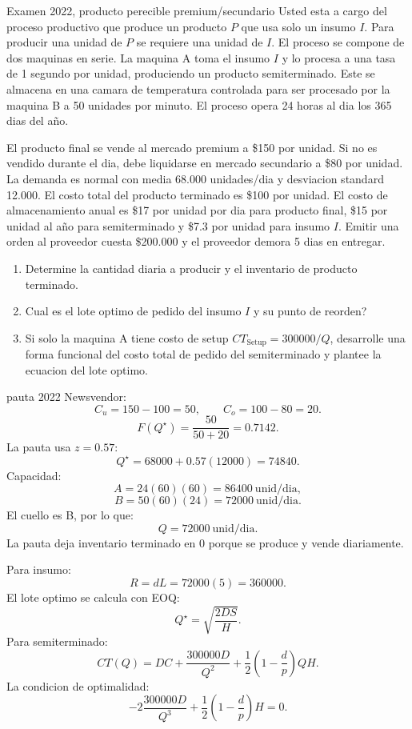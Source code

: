 \begin{enunciado}{Examen 2022, producto perecible premium/secundario}
Usted esta a cargo del proceso productivo que produce un producto $P$ que usa solo un insumo $I$. Para producir una unidad de $P$ se requiere una unidad de $I$. El proceso se compone de dos maquinas en serie. La maquina A toma el insumo $I$ y lo procesa a una tasa de 1 segundo por unidad, produciendo un producto semiterminado. Este se almacena en una camara de temperatura controlada para ser procesado por la maquina B a 50 unidades por minuto. El proceso opera 24 horas al dia los 365 dias del año.

El producto final se vende al mercado premium a \$150 por unidad. Si no es vendido durante el dia, debe liquidarse en mercado secundario a \$80 por unidad. La demanda es normal con media 68.000 unidades/dia y desviacion standard 12.000. El costo total del producto terminado es \$100 por unidad. El costo de almacenamiento anual es \$17 por unidad por dia para producto final, \$15 por unidad al año para semiterminado y \$7.3 por unidad para insumo $I$. Emitir una orden al proveedor cuesta \$200.000 y el proveedor demora 5 dias en entregar.

\begin{enumerate}[label=\roman*.]
  \item Determine la cantidad diaria a producir y el inventario de producto terminado.
  \item Cual es el lote optimo de pedido del insumo $I$ y su punto de reorden?
  \item Si solo la maquina A tiene costo de setup $CT_{\text{Setup}}=300000/Q$, desarrolle una forma funcional del costo total de pedido del semiterminado y plantee la ecuacion del lote optimo.
\end{enumerate}
\end{enunciado}

\begin{pautacompleta}{pauta 2022}
Newsvendor:
\[
  C_u=150-100=50,\qquad C_o=100-80=20.
\]
\[
  F(Q^\star)=\frac{50}{50+20}=0.7142.
\]
La pauta usa $z=0.57$:
\[
  Q^\star=68000+0.57(12000)=74840.
\]
Capacidad:
\[
  A=24(60)(60)=86400\ \text{unid/dia},
\]
\[
  B=50(60)(24)=72000\ \text{unid/dia}.
\]
El cuello es B, por lo que:
\[
  Q=72000\ \text{unid/dia}.
\]
La pauta deja inventario terminado en 0 porque se produce y vende diariamente.

Para insumo:
\[
  R=dL=72000(5)=360000.
\]
El lote optimo se calcula con EOQ:
\[
  Q^\star=\sqrt{\frac{2DS}{H}}.
\]
Para semiterminado:
\[
  CT(Q)=DC+\frac{300000D}{Q^2}
  +\frac{1}{2}\left(1-\frac{d}{p}\right)QH.
\]
La condicion de optimalidad:
\[
  -2\frac{300000D}{Q^3}
  +\frac{1}{2}\left(1-\frac{d}{p}\right)H=0.
\]
\end{pautacompleta}

